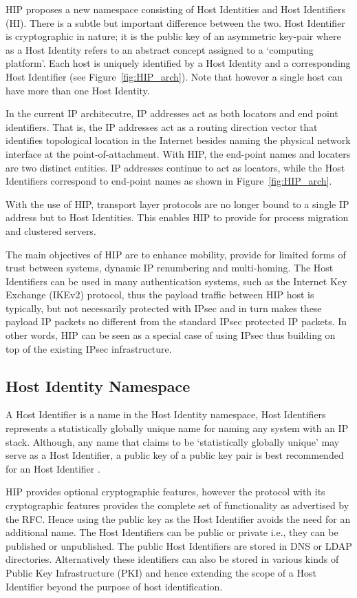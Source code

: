 HIP \cite{HIP_rfc} proposes a new namespace consisting of Host Identities and Host Identifiers (HI). There is a subtle but important difference between the two. Host Identifier is cryptographic in nature; it is the public key of an asymmetric key-pair where as a Host Identity refers to an abstract concept assigned to a `computing platform'. Each host is uniquely identified by a Host Identity and a corresponding Host Identifier (see Figure~\ref{fig:HIP_arch}). Note that however a single host can have more than one Host Identity.

In the current IP architecutre, IP addresses act as both locators and end point identifiers. That is, the IP addresses act as a routing direction vector that identifies  topological location in the Internet besides naming the physical network interface at the point-of-attachment. With HIP, the end-point names and locaters are two distinct entities. IP addresses continue to act as locators, while the Host Identifiers correspond to end-point names as shown in Figure~\ref{fig:HIP_arch}. 

With the use of HIP, transport layer protocols are no longer bound to a single IP address but to Host Identities. This enables HIP to provide for process migration and clustered servers.

The main objectives of HIP are to enhance mobility, provide for limited forms of trust between systems, dynamic IP renumbering and multi-homing. The Host Identifiers can be used in many authentication systems, such as the Internet Key Exchange (IKEv2) protocol, thus the payload traffic between HIP host is typically, but not necessarily protected with IPsec and in turn makes these payload IP packets no different from the standard IPsec protected IP packets. In other words, HIP can be seen as a special case of using IPsec thus building on top of the existing IPsec infrastructure.

\subsection{Host Identity Namespace}

A Host Identifier is a name in the Host Identity namespace, Host Identifiers represents a statistically globally unique name for naming any system with an IP stack. Although, any name that claims to be ‘statistically globally unique’ may serve as a Host Identifier, a public key of a public key pair is best recommended for an Host Identifier \cite{HIP_rfc}. 

HIP provides optional cryptographic features, however the protocol with its cryptographic features provides the complete set of functionality as advertised by the RFC. Hence using the public key as the Host Identifier avoids the need for an additional name. The Host Identifiers can be public or private i.e., they can be published or unpublished. The public Host Identifiers are stored in DNS or LDAP directories. Alternatively these identifiers can also be stored in various kinds of Public Key Infrastructure (PKI) and hence extending the scope of a Host Identifier beyond the purpose of host identification.

